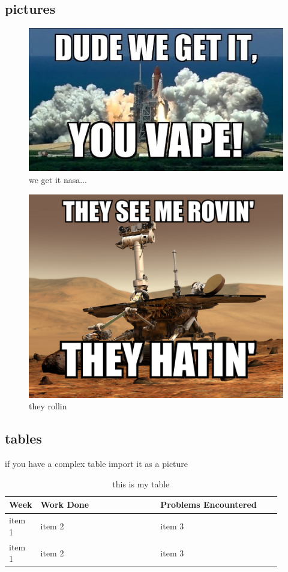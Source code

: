 \subsection{pictures}
\begin{figure}[H]
	\centering
	\includegraphics[width=.9\linewidth]{meme.jpg}
	\caption{we get it nasa...}
\end{figure}

\begin{figure}[H]
	\centering
	\includegraphics[width=.9\linewidth]{rover.jpg}
	\caption{they rollin}
\end{figure}

\subsection{tables}
if you have a complex table import it as a picture
\\%

\begin{table}[hp]
\centering
\begin{tabular} {l p{0.45\linewidth} p{0.45\linewidth}} \textbf{Week} & \textbf{Work Done} & \textbf{Problems Encountered}\\\hline
item 1 & item 2 & item 3 \\
item 1 & item 2 & item 3 \\
\end{tabular}
\caption{this is my table}
\end{table}

